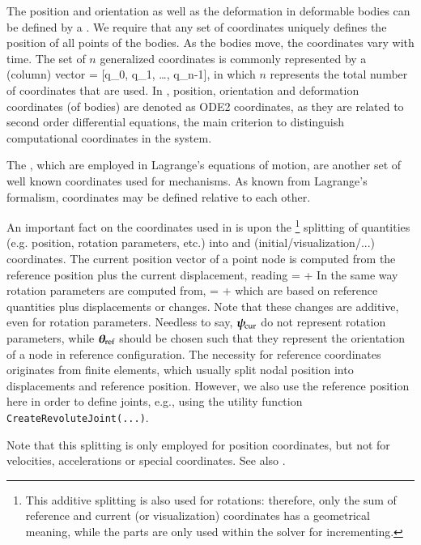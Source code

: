 The position and orientation as well as the deformation in deformable bodies can be defined by a . We require that any set of coordinates uniquely defines the position of all points of the bodies.
As the bodies move, the coordinates vary with time.
The set of $n$ generalized coordinates is commonly represented by a (column) vector
\be
  \qv = [q_0, q_1, \ldots, q_{n-1}]\tp,
\ee
in which $n$ represents the total number of coordinates that are used. 
In \codeName, position, orientation and deformation coordinates (of bodies) are denoted as \ac{ODE2} coordinates, as they are related to second order differential equations, the main criterion to distinguish computational coordinates in the system.

The , which are employed in Lagrange's equations of motion, are another set of well known coordinates used for mechanisms. As known from Lagrange's formalism, coordinates may be defined relative to each other.

\label{sec:referenceAndCurrentCoordinates}
%
An important fact on the coordinates used in \codeName is upon the \footnote{This additive splitting is also used for rotations: therefore, only the sum of reference and current (or visualization) coordinates has a geometrical meaning, while the parts are only used within the solver for incrementing.} splitting of quantities (e.g. position, rotation parameters, etc.) into  and  (initial/visualization/...) coordinates.
The current position vector of a point node is computed from the reference position plus the current displacement, reading
\be
  \pv\cCur = \pv\cRef + \uv\cCur
\ee
In the same way rotation parameters are computed from,
\be
  \ttheta\cCur = \ttheta\cRef + \tpsi\cCur
\ee
which are based on reference quantities plus displacements or changes. Note that these changes are additive, even for rotation parameters. Needless to say, $\mbox{\boldmath $\psi$ \unboldmath}\!\!_\mathrm{cur}$ do not represent rotation parameters, while $\mbox{\boldmath $\theta$ \unboldmath}\!\!_\mathrm{ref}$ should be chosen such that they represent the orientation of a node in reference configuration.
The necessity for reference coordinates originates from finite elements, which usually split nodal position into displacements and reference position.
However, we also use the reference position here in order to define joints, e.g., using the utility function \texttt{CreateRevoluteJoint(...)}.

Note that this splitting is only employed for position coordinates, but not for velocities, accelerations or special coordinates. See also .

